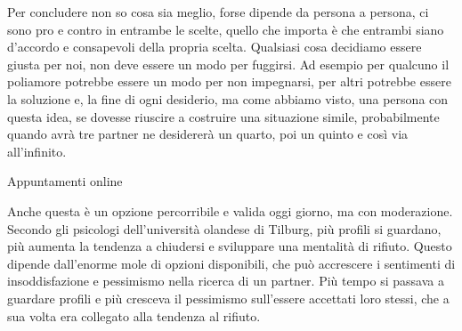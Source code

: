 \documentclass[12pt]{book} %
\begin{document}
Per concludere non so cosa sia meglio, forse dipende da persona a persona, ci sono pro e contro in entrambe le scelte,
quello che importa è che entrambi siano d'accordo e consapevoli della propria scelta. Qualsiasi
cosa decidiamo essere giusta per noi, non deve essere un modo per fuggirsi. Ad esempio per qualcuno il poliamore
potrebbe essere un modo per non impegnarsi, per altri potrebbe essere la soluzione e, la fine di ogni desiderio, ma
come abbiamo visto, una persona con questa idea, se dovesse riuscire a costruire una situazione simile, probabilmente
quando avrà tre partner ne desidererà un quarto, poi un quinto e così via all'infinito.

\begin{mdframed}[linewidth=1pt]
Appuntamenti online

Anche questa è un opzione percorribile e valida oggi giorno, ma con moderazione. Secondo gli psicologi dell'università
olandese di Tilburg, più profili si guardano, più aumenta la tendenza a chiudersi e sviluppare una mentalità di
rifiuto. Questo dipende dall'enorme mole di opzioni disponibili, che può accrescere i sentimenti
di insoddisfazione e pessimismo nella ricerca di un partner. Più tempo si passava a guardare profili e più cresceva il
pessimismo sull'essere accettati loro stessi, che a sua volta era collegato alla tendenza al rifiuto.
\end{mdframed}
\end{document}
